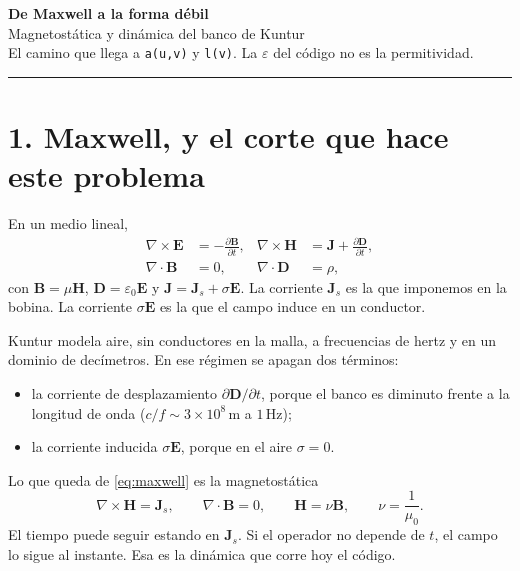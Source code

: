 \documentclass[11pt]{article}
\newcommand{\curl}{\nabla\times}
\newcommand{\nv}{\nu}
\begin{document}
\begin{center}
{\Large\bfseries De Maxwell a la forma débil}\\[0.35em]
{\large Magnetostática y dinámica del banco de Kuntur}\\[0.55em]
{\small El camino que llega a \texttt{a(u,v)} y \texttt{l(v)}.
La \(\varepsilon\) del código no es la permitividad.}
\end{center}

\vspace{0.2em}
\noindent\textcolor{rule}{\rule{\linewidth}{0.6pt}}

\section*{1. Maxwell, y el corte que hace este problema}

En un medio lineal,
\begin{align}
\curl\mathbf{E} &= -\frac{\partial\mathbf{B}}{\partial t}, &
\curl\mathbf{H} &= \mathbf{J} + \frac{\partial\mathbf{D}}{\partial t}, \label{eq:maxwell}\\
\nabla\cdot\mathbf{B} &= 0, &
\nabla\cdot\mathbf{D} &= \rho, \nonumber
\end{align}
con \(\mathbf{B}=\mu\mathbf{H}\), \(\mathbf{D}=\varepsilon_0\mathbf{E}\) y
\(\mathbf{J}=\mathbf{J}_{s}+\sigma\mathbf{E}\).
La corriente \(\mathbf{J}_{s}\) es la que imponemos en la bobina.
La corriente \(\sigma\mathbf{E}\) es la que el campo induce en un conductor.

Kuntur modela aire, sin conductores en la malla, a frecuencias de hertz y en un dominio de decímetros. En ese régimen se apagan dos términos:

\begin{itemize}
  \item la corriente de desplazamiento \(\partial\mathbf{D}/\partial t\), porque el banco es diminuto frente a la longitud de onda (\(c/f\sim 3\times 10^{8}\,\mathrm{m}\) a \(1\,\mathrm{Hz}\));
  \item la corriente inducida \(\sigma\mathbf{E}\), porque en el aire \(\sigma=0\).
\end{itemize}

Lo que queda de \eqref{eq:maxwell} es la magnetostática
\begin{equation}
\curl\mathbf{H}=\mathbf{J}_{s},
\qquad
\nabla\cdot\mathbf{B}=0,
\qquad
\mathbf{H}=\nv\mathbf{B},
\qquad
\nv=\frac{1}{\mu_0}.
\label{eq:magnetostatica}
\end{equation}
El tiempo puede seguir estando en \(\mathbf{J}_{s}\). Si el operador no depende de \(t\), el campo lo sigue al instante. Esa es la dinámica que corre hoy el código.
\end{document}
